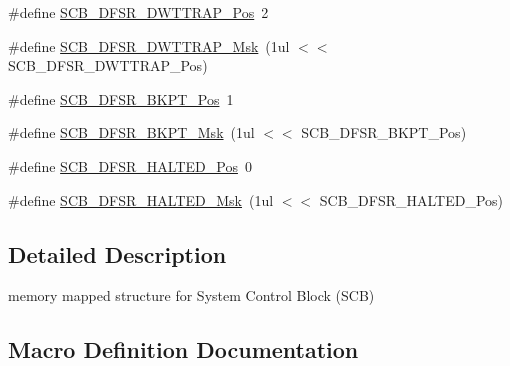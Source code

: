 \begin{DoxyCompactItemize}
\item 
\#define \hyperlink{group__CMSIS__CM3__SCB_gaccf82364c6d0ed7206f1084277b7cc61}{S\+C\+B\+\_\+\+D\+F\+S\+R\+\_\+\+D\+W\+T\+T\+R\+A\+P\+\_\+\+Pos}~2
\item 
\#define \hyperlink{group__CMSIS__CM3__SCB_ga3f7384b8a761704655fd45396a305663}{S\+C\+B\+\_\+\+D\+F\+S\+R\+\_\+\+D\+W\+T\+T\+R\+A\+P\+\_\+\+Msk}~(1ul $<$$<$ S\+C\+B\+\_\+\+D\+F\+S\+R\+\_\+\+D\+W\+T\+T\+R\+A\+P\+\_\+\+Pos)
\item 
\#define \hyperlink{group__CMSIS__CM3__SCB_gaf28fdce48655f0dcefb383aebf26b050}{S\+C\+B\+\_\+\+D\+F\+S\+R\+\_\+\+B\+K\+P\+T\+\_\+\+Pos}~1
\item 
\#define \hyperlink{group__CMSIS__CM3__SCB_ga609edf8f50bc49adb51ae28bcecefe1f}{S\+C\+B\+\_\+\+D\+F\+S\+R\+\_\+\+B\+K\+P\+T\+\_\+\+Msk}~(1ul $<$$<$ S\+C\+B\+\_\+\+D\+F\+S\+R\+\_\+\+B\+K\+P\+T\+\_\+\+Pos)
\item 
\#define \hyperlink{group__CMSIS__CM3__SCB_gaef4ec28427f9f88ac70a13ae4e541378}{S\+C\+B\+\_\+\+D\+F\+S\+R\+\_\+\+H\+A\+L\+T\+E\+D\+\_\+\+Pos}~0
\item 
\#define \hyperlink{group__CMSIS__CM3__SCB_ga200bcf918d57443b5e29e8ce552e4bdf}{S\+C\+B\+\_\+\+D\+F\+S\+R\+\_\+\+H\+A\+L\+T\+E\+D\+\_\+\+Msk}~(1ul $<$$<$ S\+C\+B\+\_\+\+D\+F\+S\+R\+\_\+\+H\+A\+L\+T\+E\+D\+\_\+\+Pos)
\end{DoxyCompactItemize}


\subsection{Detailed Description}
memory mapped structure for System Control Block (S\+CB) 

\subsection{Macro Definition Documentation}
